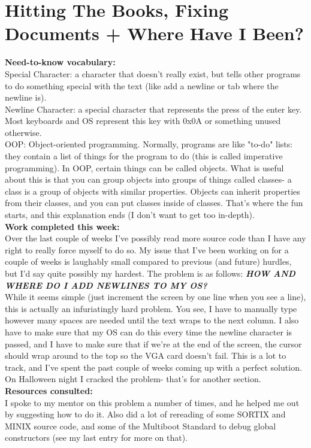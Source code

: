 \documentclass[11pt]{article}
\begin{document}
\section{Hitting The Books, Fixing Documents + Where Have I Been?}
\textbf{Need-to-know vocabulary:}\\
Special Character: a character that doesn't really exist, but tells other programs to do something special with the text (like add a newline or tab where the newline is).\\
Newline Character: a special character that represents the press of the enter key. Most keyboards and OS represent this key with 0x0A or something unused otherwise.\\
OOP: Object-oriented programming. Normally, programs are like "to-do" lists: they contain a list of things for the program to do (this is called imperative programming). In OOP, certain things can be called objects. What is useful about this is that you can group objects into groups of things called classes- a class is a group of objects with similar properties. Objects can inherit properties from their classes, and you can put classes inside of classes. That's where the fun starts, and this explanation ends (I don't want to get too in-depth).\\
\textbf{Work completed this week:}\\
Over the last couple of weeks I've possibly read more source code than I have any right to really force myself to do so. My issue that I've been working on for a couple of weeks is laughably small compared to previous (and future) hurdles, but I'd say quite possibly my hardest. The problem is as follows:
\textit{\textbf{HOW AND WHERE DO I ADD NEWLINES TO MY OS?}}\\
While it seems simple (just increment the screen by one line when you see a line), this is actually an infuriatingly hard problem. You see, I have to manually type however many spaces are needed until the text wraps to the next column. I also have to make sure that my OS can do this every time the newline character is passed, and I have to make sure that if we're at the end of the screen, the cursor should wrap around to the top so the VGA card doesn't fail. This is a lot to track, and I've spent the past couple of weeks coming up with a perfect solution. On Halloween night I cracked the problem- that's for another section.\\
\textbf{Resources consulted:}\\
I spoke to my mentor on this problem a number of times, and he helped me out by suggesting how to do it. Also did a lot of rereading of some SORTIX and MINIX source code, and some of the Multiboot Standard to debug global constructors (see my last entry for more on that).\\
\end{document}
